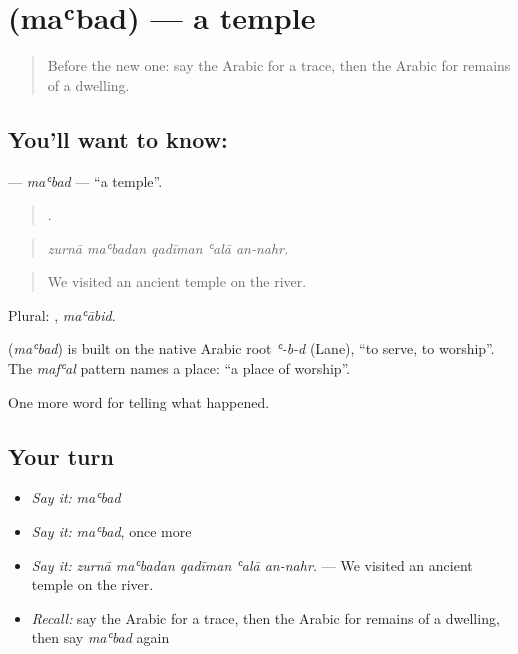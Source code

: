 \section[\texorpdfstring{\ar{معبد} (maʿbad)}{معبد (maʿbad)}]{ (maʿbad) — a temple}

\label{lesson:AR-C318-mabad}



\begin{quote}
Before the new one: say the Arabic for a trace, then the Arabic for remains of a dwelling.
\end{quote}

\subsection*{You'll want to know: }
\textbf{} — \emph{maʿbad} — \textquotedblleft{}a temple\textquotedblright{}.

\begin{quote}
    .
\end{quote}

\begin{quote}
\emph{zurnā maʿbadan qadīman ʿalā an-nahr.}
\end{quote}

\begin{quote}
We visited an ancient temple on the river.
\end{quote}

Plural: , \emph{maʿābid}.

\begin{cousinweb}
\textbf{} (\emph{maʿbad}) is built on the native Arabic root \emph{ʿ-b-d} (Lane), \textquotedblleft{}to serve, to worship\textquotedblright{}. The \emph{mafʿal} pattern names a place: \textquotedblleft{}a place of worship\textquotedblright{}.
\end{cousinweb}

\begin{grammarlens}[title={What you've built}]
One more word for telling what happened.
\end{grammarlens}

\subsection*{Your turn}
\begin{itemize}
\raggedright
  \item \emph{Say it:} \emph{maʿbad}
  \item \emph{Say it:} \emph{maʿbad}, once more
  \item \emph{Say it:} \emph{zurnā maʿbadan qadīman ʿalā an-nahr.} — We visited an ancient temple on the river.
  \item \emph{Recall:} say the Arabic for a trace, then the Arabic for remains of a dwelling, then say \emph{maʿbad} again
\end{itemize}

